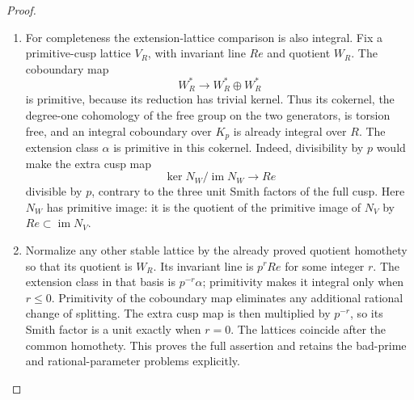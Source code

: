 \begin{proof}
\begin{enumerate}[label=\arabic*.]
\item For completeness the extension-lattice comparison is also
integral.  Fix a primitive-cusp lattice $V_R$, with invariant
line $Re$ and quotient $W_R$.
The coboundary map
\[
 W_R^*\longrightarrow W_R^*\oplus W_R^*
\]
is primitive, because its reduction has trivial kernel.
Thus its cokernel, the degree-one cohomology of the free
group on the two generators, is torsion free, and an
integral coboundary over $K_p$ is already integral over $R$.
The extension class $\alpha$ is primitive in this cokernel.
Indeed, divisibility by $p$ would make the extra cusp map
\[
 \ker N_W/\operatorname{im}N_W\longrightarrow Re
\]
divisible by $p$, contrary to the three unit Smith factors
of the full cusp.  Here $N_W$ has primitive image:
it is the quotient of the primitive image of $N_V$ by
$Re\subset\operatorname{im}N_V$.

\item Normalize any other stable lattice by the already proved
quotient homothety so that its quotient is $W_R$.
Its invariant line is $p^rRe$ for some integer $r$.
The extension class in that basis is $p^{-r}\alpha$;
primitivity makes it integral only when $r\leq0$.
Primitivity of the coboundary map eliminates any additional
rational change of splitting.  The extra cusp map is then
multiplied by $p^{-r}$, so its Smith factor is a unit exactly
when $r=0$.  The lattices coincide after the common homothety.
This proves the full assertion and retains the bad-prime
and rational-parameter problems explicitly.

\end{enumerate}
\end{proof}




